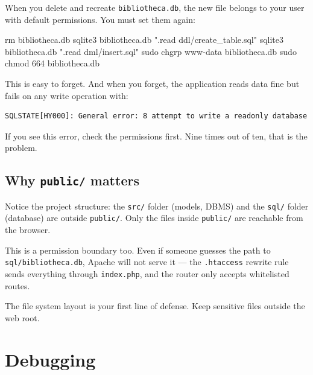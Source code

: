 \documentclass[11pt,a4paper,oneside]{book}
\newenvironment{Shaded}{\begin{snugshade}}{\end{snugshade}}
\newcommand{\StringTok}[1]{\textcolor[HTML]{4070A0}{#1}}
\newcommand{\FunctionTok}[1]{\textcolor[HTML]{06287E}{#1}}
\newcommand{\ExtensionTok}[1]{#1}
\newcommand{\NormalTok}[1]{#1}
\begin{document}
When you delete and recreate \texttt{bibliotheca.db}, the new
file belongs to your user with default permissions. You must set
them again:

\begin{Shaded}
\begin{Highlighting}[]
\FunctionTok{rm}\NormalTok{ bibliotheca.db}
\ExtensionTok{sqlite3}\NormalTok{ bibliotheca.db }\StringTok{".read ddl/create\_table.sql"}
\ExtensionTok{sqlite3}\NormalTok{ bibliotheca.db }\StringTok{".read dml/insert.sql"}
\FunctionTok{sudo}\NormalTok{ chgrp www{-}data bibliotheca.db}
\FunctionTok{sudo}\NormalTok{ chmod 664 bibliotheca.db}
\end{Highlighting}
\end{Shaded}

This is easy to forget. And when you forget, the application
reads data fine but fails on any write operation with:

\begin{verbatim}
SQLSTATE[HY000]: General error: 8 attempt to write a readonly database
\end{verbatim}

If you see this error, check the permissions first. Nine times
out of ten, that is the problem.

\hypertarget{why-public-matters}{%
\section{\texorpdfstring{Why \texttt{public/}
matters}{Why public/ matters}}\label{why-public-matters}}

Notice the project structure: the \texttt{src/} folder (models,
DBMS) and the \texttt{sql/} folder (database) are outside
\texttt{public/}. Only the files inside \texttt{public/} are
reachable from the browser.

This is a permission boundary too. Even if someone guesses the
path to \texttt{sql/bibliotheca.db}, Apache will not serve it ---
the \texttt{.htaccess} rewrite rule sends everything through
\texttt{index.php}, and the router only accepts whitelisted
routes.

The file system layout is your first line of defense. Keep
sensitive files outside the web root.

\newpage

\hypertarget{debugging}{%
\chapter{Debugging}\label{debugging}}
\end{document}

